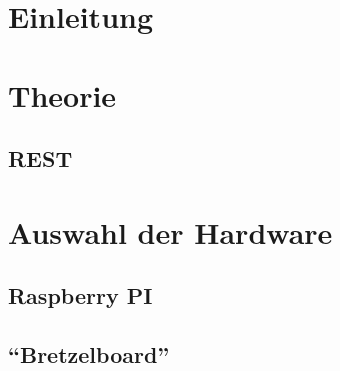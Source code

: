 \documentclass[ngerman]{scrartcl} %
\begin{document}
\tableofcontents
\newpage
 
\section{Einleitung}        
\label{sec:Einleitung-1}       

\section{Theorie}        
\label{sec:Theorie-1}  
 
\subsection{REST}        
\label{sec:REST-1}  

 \cite{Tilkov.2015}
 
\section{Auswahl der Hardware}        
\label{sec:Auswahl der Hardware-1}  

\subsection{Raspberry PI}        
\label{sec:Raspberry PI-1} 

\subsection{``Bretzelboard''}        
\label{sec:''Bretzelboard''-1} 

\newpage



 
\end{document}
